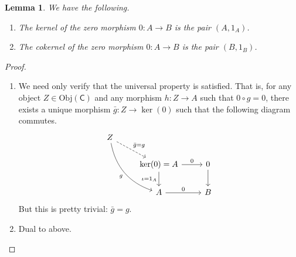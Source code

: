 \documentclass[a4paper]{report}
\newcommand{\Obj}{\mathrm{Obj}}
\theoremstyle{definition}
\theoremstyle{plain}
\newtheorem{lemma}{Lemma}[section]
\theoremstyle{remark}
\begin{document}
\begin{lemma}
  We have the following.
  \begin{enumerate}
    \item The kernel of the zero morphism $0: A \to B$ is the pair $(A, 1_{A})$.
    \item The cokernel of the zero morphism $0: A \to B$ is the pair $(B, 1_{B})$.
  \end{enumerate}
\end{lemma}
\begin{proof}
  $\,$
  \begin{enumerate}
    \item We need only verify that the universal property is satisfied. That is, for any object $Z \in \Obj(\mathsf{C})$ and any morphism $h\colon Z \to A$ such that $0 \circ g = 0$, there exists a unique morphism $\bar{g}\colon Z \to \ker(0)$ such that the following diagram commutes.
      \begin{equation*}
        \begin{tikzcd}
          Z
          \arrow[rdd, swap, bend right, "g"]
          \arrow[rd, dashed, "\bar{g}=g"]
          \\
          & \ker(0) = A
          \arrow[r, "0"]
          \arrow[d, swap, "\iota = 1_{A}"]
          & 0
          \arrow[d]
          \\
          & A
          \arrow[r, "0"]
          & B
        \end{tikzcd}
      \end{equation*}
      But this is pretty trivial: $\bar{g} = g$.

    \item Dual to above.
  \end{enumerate}
\end{proof}
\end{document}

